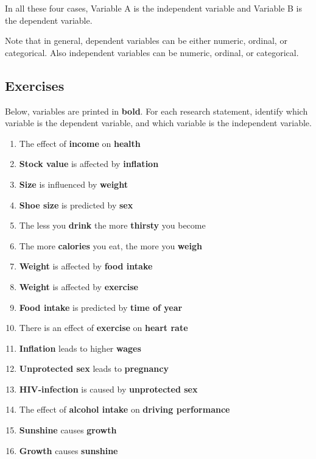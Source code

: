 \documentclass[]{book}\usepackage[]{graphicx}\usepackage[]{color}
\begin{document}
In all these four cases, Variable A is the independent variable and Variable B is the dependent variable.

Note that in general, dependent variables can be either numeric, ordinal, or categorical. Also independent variables can be numeric, ordinal, or categorical. 

\subsection{Exercises}

Below, variables are printed in \textbf{bold}. For each research statement, identify which variable is the dependent variable, and which variable is the independent variable.

\begin{enumerate}

\item The effect of \textbf{income} on \textbf{health}
\item \textbf{Stock value} is affected by \textbf{inflation}
\item \textbf{Size} is influenced by \textbf{weight}
\item \textbf{Shoe size} is predicted by \textbf{sex}
\item The less you \textbf{drink} the more \textbf{thirsty} you become 
\item The more \textbf{calories} you eat, the more you \textbf{weigh}
\item \textbf{Weight} is affected by \textbf{food intake} 
\item \textbf{Weight} is affected by \textbf{exercise} 
\item \textbf{Food intake} is predicted by \textbf{time of year}
\item There is an effect of \textbf{exercise} on \textbf{heart rate} 
\item \textbf{Inflation} leads to higher \textbf{wages} 
\item \textbf{Unprotected sex} leads to \textbf{pregnancy}
\item \textbf{HIV-infection} is caused by \textbf{unprotected sex}
\item The effect of \textbf{alcohol intake} on \textbf{driving performance}
\item \textbf{Sunshine} causes \textbf{growth}
\item \textbf{Growth} causes \textbf{sunshine}

\end{enumerate}
\end{document}
